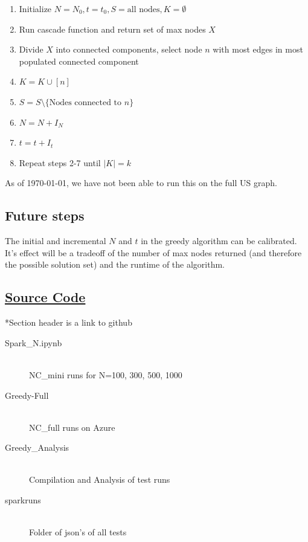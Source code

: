 \documentclass{article}
\begin{document}
\begin{description}
			\begin{enumerate}
			  \item Initialize $N=N_0,t=t_0,S=\text{all nodes},K=\emptyset$
			  \item Run cascade function and return set of max nodes $X$
			  \item Divide $X$ into connected components, select node $n$ with most edges in most populated connected component
			  \item $K = K \cup [n]$
			  \item $S = S \setminus \{\text{Nodes connected to }n\}$
			  \item $N = N + I_N$
			  \item $t = t + I_t$
			  \item Repeat steps 2-7 until $|K|=k$
			\end{enumerate}

			As of \today, we have not been able to run this on the full US graph.
			
	\end{description}

	\subsection{Future steps}

		The initial and incremental $N$ and $t$ in the greedy algorithm can be calibrated. It's effect will be a tradeoff of the number of max nodes returned (and therefore the possible solution set) and the runtime of the algorithm.

	\subsection{\href{https://github.com/chuckyouliu/Influence-Maximization}{Source Code}}

	*Section header is a link to github

	\begin{description}
		\item[Spark\_N.ipynb] \hfill \\
			NC\_mini runs for N=100, 300, 500, 1000
		\item[Greedy-Full] \hfill \\
			NC\_full runs on Azure
		\item[Greedy\_Analysis] \hfill \\
			Compilation and Analysis of test runs
		\item[sparkruns] \hfill \\
			Folder of json's of all tests
	\end{description}
\end{document}
